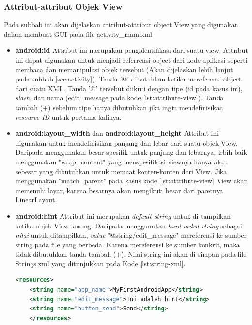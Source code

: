 \subsubsection{Attribut-attribut Objek View}
Pada subbab ini akan dijelaskan attribut-attribut object View yang digunakan dalam membuat GUI pada file activity\_main.xml
\begin{itemize}
	\item \textbf{android:id}
	Attribut ini merupakan pengidentifikasi dari suatu view. Attribut ini dapat digunakan untuk menjadi referrensi object dari kode aplikasi seperti membaca dan memanipulasi objek tersebut (Akan dijelaskan lebih lanjut pada subbab \ref{sec:activity}). Tanda '@' dibutuhkan ketika mereferensi object dari suatu XML. Tanda '@' tersebut diikuti dengan tipe (id pada kasus ini), \textit{slash}, dan nama (edit\_message pada kode \ref{lst:attribute-view}). Tanda tambah (+) sebelum tipe hanya dibutuhkan jika ingin mendefinisikan \textit{resource ID} untuk pertama kalinya.
	\item \textbf{android:layout\_width} dan \textbf{android:layout\_height}
	Attribut ini digunakan untuk mendefinisikan panjang dan lebar dari suatu objek View. Daripada menggunakan besar spesifik untuk panjang dan lebarnya, lebih baik menggunakan "wrap\_content" yang menspesifikasi viewnya hanya akan sebesar yang dibutuhkan untuk memuat konten-konten dari View. Jika menggunakan "match\_parent" pada kasus kode \ref{lst:attribute-view} View akan memenuhi layar, karena besarnya akan mengikuti besar dari paretnya LinearLayout.


	\item \textbf{android:hint}
	Attribut ini merupakan \textit{default string} untuk di tampilkan ketika objek View kosong. Daripada menggunakan \textit{hard-coded string} sebagai \textit{nilai} untuk ditampilkan, \textit{value} "@string/edit\_message" mereferensi ke sumber string pada file yang berbeda. Karena mereferensi ke sumber konkrit, maka tidak dibutuhkan tanda tambah (+). Nilai string ini akan di simpan pada file Strings.xml yang ditunjukkan pada Kode \ref{lst:string-xml}.
	\begin{lstlisting}[caption={Contoh kode pada string.xml},label={lst:string-xml},language=xml]
	<resources>
    <string name="app_name">MyFirstAndroidApp</string>
    <string name="edit_message">Ini adalah hint</string>
    <string name="button_send">Send</string>
	</resources>

\end{lstlisting}



\end{itemize}
